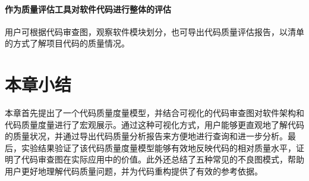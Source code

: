 \paragraph{作为质量评估工具对软件代码进行整体的评估} 用户可根据代码审查图，观察软件模块划分，也可导出代码质量评估报告，以清单的方式了解项目代码的质量情况。



\section{本章小结}

本章首先提出了一个代码质量度量模型，并结合可视化的代码审查图对软件架构和代码质量度量进行了宏观展示。通过这种可视化方式，用户能够更直观地了解代码的质量状况，并通过导出代码质量分析报告来方便地进行查询和进一步分析。最后，实验结果验证了该代码质量度量模型能够有效地反映代码的相对质量水平，证明了代码审查图在实际应用中的价值。此外还总结了五种常见的不良图模式，帮助用户更好地理解代码质量问题，并为代码重构提供了有效的参考依据。

